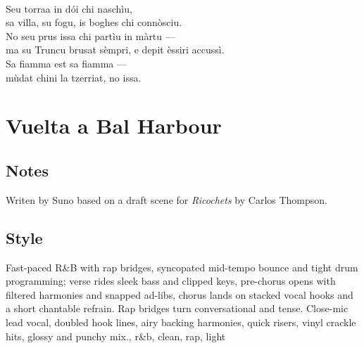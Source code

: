 \begin{lyrics}
\\
Seu torraa in dói chi naschìu,\\
sa villa, su fogu, is boghes chi connòsciu.\\
No seu prus issa chi partìu in màrtu —\\
ma su Truncu brusat sèmpri, e depit èssiri accussì.
\\
Sa fiamma est sa fiamma —\\
mùdat chini la tzerriat, no issa.


\end{lyrics}

\section{Vuelta a Bal Harbour}

\subsection{Notes}
Writen by Suno based on a draft scene for \emph{Ricochets} by Carlos Thompson.

\subsection{Style}
Fast-paced R\&B with rap bridges, syncopated mid-tempo bounce and tight drum programming; verse rides sleek bass and clipped keys, pre-chorus opens with filtered harmonies and snapped ad-libs, chorus lands on stacked vocal hooks and a short chantable refrain. Rap bridges turn conversational and tense. Close-mic lead vocal, doubled hook lines, airy backing harmonies, quick risers, vinyl crackle hits, glossy and punchy mix., r\&b, clean, rap, light


